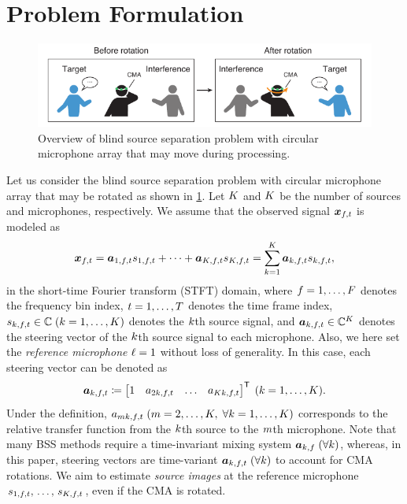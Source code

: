 \documentclass[sip,biber]{now-journal}
\begin{document}
\section{Problem Formulation}\label{sec:problem}
\begin{figure}[t]
  \centering
  \includegraphics{figures/diagrams/bss.pdf}%
  \caption{Overview of blind source separation problem with circular microphone array that may move during processing.}%
  \label{fig:bss}
\end{figure}
Let us consider the blind source separation problem with circular microphone array that may be rotated as shown in \cref{fig:bss}.
Let $K$ and $K$ be the number of sources and microphones, respectively.
We assume that the observed signal $\Obs _{\ft}$ is modeled as
\begin{equation}
  \Obs _{\ft} = \steer _{1,\ft} \sig _{1,\ft} + \dots + \steer _{\Src,\ft} \sig _{\Src,\ft} = \sum _{\src=1} ^{\Src} \steer _{\src,\ft} \sig _{\src,\ft},\label{eq:mix}
\end{equation}
in the short-time Fourier transform (STFT) domain,
where $f = 1, \dots, F$ denotes the frequency bin index,
$t = 1, \dots, T$ denotes the time frame index,
$\sig _{\src,\ft} \in \C\; (\src = 1, \dots, \Src)$ denotes the $k$th source signal,
and $\steer _{\src,\ft} \in \C ^{\Mic}$ denotes the steering vector of the $k$th source signal to each microphone.
Also, we here set the \emph{reference microphone} $\ell = 1$ without loss of generality.
In this case, each steering vector can be denoted as
\begin{equation}
  \steer _{\src,\ft} \coloneqq \begin{bmatrix} 1 & \str _{2\src,\ft} & \dots & \str _{\Mic\src,\ft} \end{bmatrix} ^{\top}\; (\src = 1, \dots, \Src).
\end{equation}
Under the definition, $\str _{\mic\src,\ft} \; (\mic = 2, \dots, \Mic,\; \forall \src = 1, \dots, \Src)$ corresponds to the relative transfer function from the $k$th source to the $m$th microphone.
Note that many BSS methods require a time-invariant mixing system $\bm{a} _{k,f}\; (\forall k)$,
whereas, in this paper, steering vectors are time-variant $\steer _{\src,\ft}\; (\forall \src)$ to account for CMA rotations.
We aim to estimate \emph{source images} at the reference microphone $\sig _{1,\ft},\, \dots,\, \sig _{\Src,\ft}$, even if the CMA is rotated.
\end{document}
